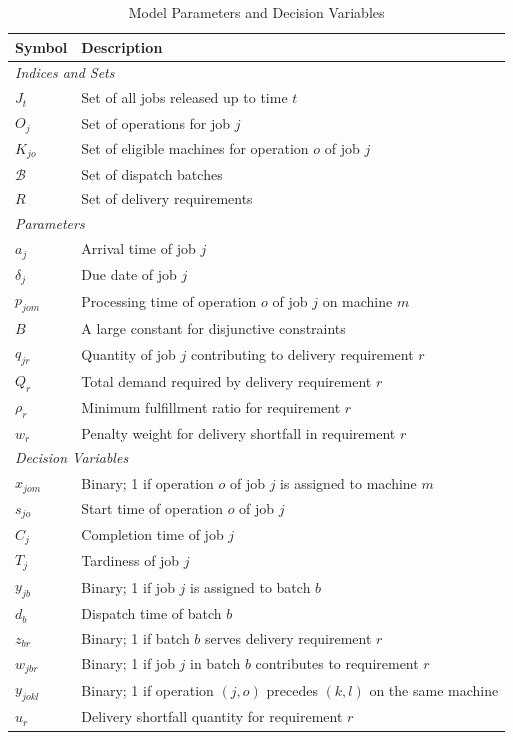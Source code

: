 \documentclass{article}
\begin{document}
\begin{table}[H]
\centering
\caption{Model Parameters and Decision Variables}
\begin{tabular}{ll}
\toprule
\textbf{Symbol} & \textbf{Description} \\
\midrule
\multicolumn{2}{l}{\textit{Indices and Sets}} \\
$J_t$ & Set of all jobs released up to time $t$ \\
$O_j$ & Set of operations for job $j$ \\
$K_{jo}$ & Set of eligible machines for operation $o$ of job $j$ \\
$\mathcal{B}$ & Set of dispatch batches \\
$R$ & Set of delivery requirements \\
\midrule
\multicolumn{2}{l}{\textit{Parameters}} \\
$a_j$ & Arrival time of job $j$ \\
$\delta_j$ & Due date of job $j$ \\
$p_{jom}$ & Processing time of operation $o$ of job $j$ on machine $m$ \\
$B$ & A large constant for disjunctive constraints \\
$q_{jr}$ & Quantity of job $j$ contributing to delivery requirement $r$ \\
$Q_r$ & Total demand required by delivery requirement $r$ \\
$\rho_r$ & Minimum fulfillment ratio for requirement $r$ \\
$w_r$ & Penalty weight for delivery shortfall in requirement $r$ \\
\midrule
\multicolumn{2}{l}{\textit{Decision Variables}} \\
$x_{jom}$ & Binary; 1 if operation $o$ of job $j$ is assigned to machine $m$ \\
$s_{jo}$ & Start time of operation $o$ of job $j$ \\
$C_j$ & Completion time of job $j$ \\
$T_j$ & Tardiness of job $j$ \\
$y_{jb}$ & Binary; 1 if job $j$ is assigned to batch $b$ \\
$d_b$ & Dispatch time of batch $b$ \\
$z_{br}$ & Binary; 1 if batch $b$ serves delivery requirement $r$ \\
$w_{jbr}$ & Binary; 1 if job $j$ in batch $b$ contributes to requirement $r$ \\
$y_{jokl}$ & Binary; 1 if operation $(j,o)$ precedes $(k,l)$ on the same machine \\
$u_r$ & Delivery shortfall quantity for requirement $r$ \\
\bottomrule
\end{tabular}
\label{tab:variables_parameters}
\end{table}
\end{document}

